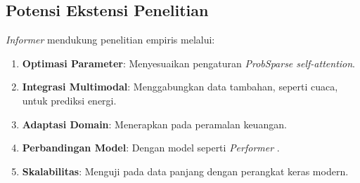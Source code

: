\subsection{Potensi Ekstensi Penelitian}
\label{sec:informer_extensions}

\textit{Informer} mendukung penelitian empiris melalui:
\begin{enumerate}
    \item \textbf{Optimasi Parameter}: Menyesuaikan pengaturan \textit{ProbSparse self-attention}.
    \item \textbf{Integrasi Multimodal}: Menggabungkan data tambahan, seperti cuaca, untuk prediksi energi.
    \item \textbf{Adaptasi Domain}: Menerapkan pada peramalan keuangan.
    \item \textbf{Perbandingan Model}: Dengan model seperti \textit{Performer} \citep{Choromanski2021}.
    \item \textbf{Skalabilitas}: Menguji pada data panjang dengan perangkat keras modern.
\end{enumerate}
